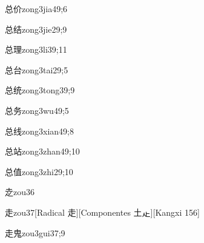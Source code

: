 \begin{verbete}{总价}{zong3jia4}{9;6}
\end{verbete}

\begin{verbete}{总结}{zong3jie2}{9;9}
\end{verbete}

\begin{verbete}{总理}{zong3li3}{9;11}
\end{verbete}

\begin{verbete}{总台}{zong3tai2}{9;5}
\end{verbete}

\begin{verbete}{总统}{zong3tong3}{9;9}
\end{verbete}

\begin{verbete}{总务}{zong3wu4}{9;5}
\end{verbete}

\begin{verbete}{总线}{zong3xian4}{9;8}
\end{verbete}

\begin{verbete}{总站}{zong3zhan4}{9;10}
\end{verbete}

\begin{verbete}{总值}{zong3zhi2}{9;10}
\end{verbete}

\begin{verbete}{赱}{zou3}{6}
\end{verbete}

\begin{verbete}{走}{zou3}{7}[Radical 走][Componentes 土龰][Kangxi 156]
\end{verbete}

\begin{verbete}{走鬼}{zou3gui3}{7;9}
\end{verbete}

